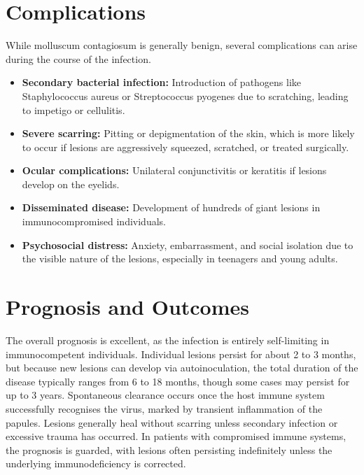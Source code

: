 \section*{Complications}
While molluscum contagiosum is generally benign, several complications can arise during the course of the infection.
\begin{itemize}
    \item \textbf{Secondary bacterial infection:} Introduction of pathogens like Staphylococcus aureus or Streptococcus pyogenes due to scratching, leading to impetigo or cellulitis.
    \item \textbf{Severe scarring:} Pitting or depigmentation of the skin, which is more likely to occur if lesions are aggressively squeezed, scratched, or treated surgically.
    \item \textbf{Ocular complications:} Unilateral conjunctivitis or keratitis if lesions develop on the eyelids.
    \item \textbf{Disseminated disease:} Development of hundreds of giant lesions in immunocompromised individuals.
    \item \textbf{Psychosocial distress:} Anxiety, embarrassment, and social isolation due to the visible nature of the lesions, especially in teenagers and young adults.
\end{itemize}

\section*{Prognosis and Outcomes}
The overall prognosis is excellent, as the infection is entirely self-limiting in immunocompetent individuals. Individual lesions persist for about 2 to 3 months, but because new lesions can develop via autoinoculation, the total duration of the disease typically ranges from 6 to 18 months, though some cases may persist for up to 3 years. Spontaneous clearance occurs once the host immune system successfully recognises the virus, marked by transient inflammation of the papules. Lesions generally heal without scarring unless secondary infection or excessive trauma has occurred. In patients with compromised immune systems, the prognosis is guarded, with lesions often persisting indefinitely unless the underlying immunodeficiency is corrected.

